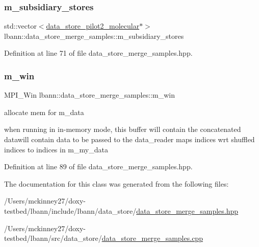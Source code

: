 \subsubsection{\texorpdfstring{m\+\_\+subsidiary\+\_\+stores}{m\_subsidiary\_stores}}
{\footnotesize\ttfamily std\+::vector$<$\hyperlink{classlbann_1_1data__store__pilot2__molecular}{data\+\_\+store\+\_\+pilot2\+\_\+molecular}$\ast$$>$ lbann\+::data\+\_\+store\+\_\+merge\+\_\+samples\+::m\+\_\+subsidiary\+\_\+stores\hspace{0.3cm}{\ttfamily [protected]}}



Definition at line 71 of file data\+\_\+store\+\_\+merge\+\_\+samples.\+hpp.

\mbox{\label{classlbann_1_1data__store__merge__samples_a8dafb907c605bb38e89ed3d91823f6f3}} 
\subsubsection{\texorpdfstring{m\+\_\+win}{m\_win}}
{\footnotesize\ttfamily M\+P\+I\+\_\+\+Win lbann\+::data\+\_\+store\+\_\+merge\+\_\+samples\+::m\+\_\+win\hspace{0.3cm}{\ttfamily [protected]}}



allocate mem for m\+\_\+data 

when running in in-\/memory mode, this buffer will contain the concatenated datawill contain data to be passed to the data\+\_\+reader maps indices wrt shuffled indices to indices in m\+\_\+my\+\_\+data 

Definition at line 89 of file data\+\_\+store\+\_\+merge\+\_\+samples.\+hpp.



The documentation for this class was generated from the following files\+:\begin{DoxyCompactItemize}
\item 
/\+Users/mckinney27/doxy-\/testbed/lbann/include/lbann/data\+\_\+store/\hyperlink{data__store__merge__samples_8hpp}{data\+\_\+store\+\_\+merge\+\_\+samples.\+hpp}\item 
/\+Users/mckinney27/doxy-\/testbed/lbann/src/data\+\_\+store/\hyperlink{data__store__merge__samples_8cpp}{data\+\_\+store\+\_\+merge\+\_\+samples.\+cpp}\end{DoxyCompactItemize}
